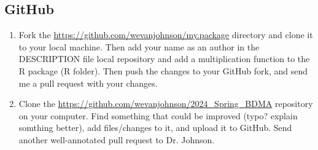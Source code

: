 \documentclass[
]{article}
\begin{document}
\subsection*{GitHub}
    \begin{enumerate}
        \item Fork the \href{https://github.com/wevanjohnson/my.package}{https://github.com/wevanjohnson/my.package} directory and clone it to your local machine. Then add your name as an author in the DESCRIPTION file local repository and add a multiplication function to the R package (R folder). Then push the changes to your GitHub fork, and send me a pull request with your changes.  
        \item Clone the \href{https://github.com/wevanjohnson/2024\_Spring\_BDMA}{https://github.com/wevanjohnson/2024\_Spring\_BDMA} repository on your computer. Find something that could be improved (typo? explain somthing better), add files/changes to it, and upload it to GitHub. Send another well-annotated pull request to Dr. Johnson. 
    \end{enumerate}
\end{document}
